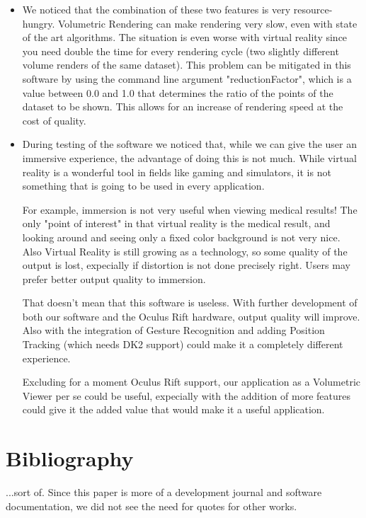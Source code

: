 \documentclass[11pt]{article} %
\begin{document}
\begin{itemize}
\item We noticed that the combination of these two features is very resource-hungry. Volumetric Rendering can make rendering very slow, even with state of the art algorithms. The situation is even worse with virtual reality since you need double the time for every rendering cycle (two slightly different volume renders of the same dataset). This problem can be mitigated in this software by using the command line argument "reductionFactor", which is a value between 0.0 and 1.0 that determines the ratio of the points of the dataset to be shown. This allows for an increase of rendering speed at the cost of quality.

\item During testing of the software we noticed that, while we can give the user an immersive experience, the advantage of doing this is not much. While virtual reality is a wonderful tool in fields like gaming and simulators, it is not something that is going to be used in every application.

 For example, immersion is not very useful when viewing medical results! The only "point of interest" in that virtual reality is the medical result, and looking around and seeing only a fixed color background is not very nice. Also Virtual Reality is still growing as a technology, so some quality of the output is lost, expecially if distortion is not done precisely right. Users may prefer better output quality to immersion.

That doesn't mean  that this software is useless. With further development of both our software and the Oculus Rift hardware, output quality will improve. Also with the integration of Gesture Recognition and adding Position Tracking (which needs DK2 support) could make it a completely different experience.

Excluding for a moment Oculus Rift support, our application as a Volumetric Viewer per se could be useful, expecially with the addition of more features could give it the added value that would make it a useful application.

\end{itemize}

\newpage

\section{Bibliography}
...sort of. Since this paper is more of a development journal and software documentation, we did not see the need for quotes for other works.
\end{document}
